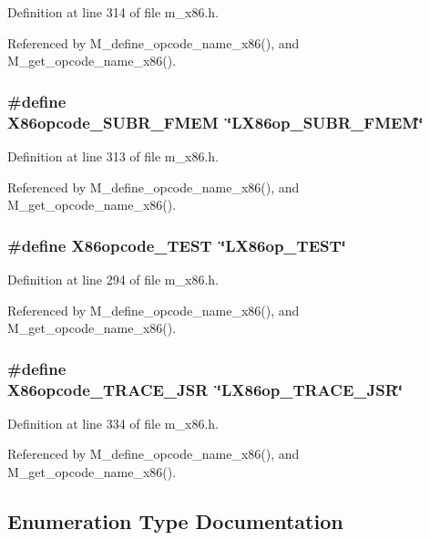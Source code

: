 Definition at line 314 of file m\_\-x86.h.

Referenced by M\_\-define\_\-opcode\_\-name\_\-x86(), and M\_\-get\_\-opcode\_\-name\_\-x86().
\subsubsection{\setlength{\rightskip}{0pt plus 5cm}\#define X86opcode\_\-SUBR\_\-FMEM~\char`\"{}LX86op\_\-SUBR\_\-FMEM\char`\"{}}\label{m__x86_8h_ee4cdf2c5ccfa7ecd8e0379dffc795bb}




Definition at line 313 of file m\_\-x86.h.

Referenced by M\_\-define\_\-opcode\_\-name\_\-x86(), and M\_\-get\_\-opcode\_\-name\_\-x86().
\subsubsection{\setlength{\rightskip}{0pt plus 5cm}\#define X86opcode\_\-TEST~\char`\"{}LX86op\_\-TEST\char`\"{}}\label{m__x86_8h_980afe9587134d723ec996e6572fd055}




Definition at line 294 of file m\_\-x86.h.

Referenced by M\_\-define\_\-opcode\_\-name\_\-x86(), and M\_\-get\_\-opcode\_\-name\_\-x86().
\subsubsection{\setlength{\rightskip}{0pt plus 5cm}\#define X86opcode\_\-TRACE\_\-JSR~\char`\"{}LX86op\_\-TRACE\_\-JSR\char`\"{}}\label{m__x86_8h_44be2a0e690739682bbb41ec1b55e633}




Definition at line 334 of file m\_\-x86.h.

Referenced by M\_\-define\_\-opcode\_\-name\_\-x86(), and M\_\-get\_\-opcode\_\-name\_\-x86().

\subsection{Enumeration Type Documentation}
